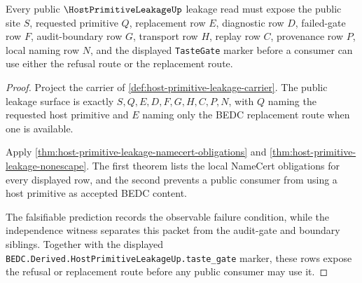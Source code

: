 \begin{theorem}
\label{thm:host-primitive-leakage-public-export}
Every public $\HostPrimitiveLeakageUp$ leakage read must expose the public site $S$, requested primitive $Q$, replacement row $E$, diagnostic row $D$, failed-gate row $F$, audit-boundary row $G$, transport row $H$, replay row $C$, provenance row $P$, local naming row $N$, and the displayed \texttt{TasteGate} marker before a consumer can use either the refusal route or the replacement route.
\end{theorem}
\begin{proof}
Project the carrier of \autoref{def:host-primitive-leakage-carrier}. The public leakage surface is exactly $S,Q,E,D,F,G,H,C,P,N$, with $Q$ naming the requested host primitive and $E$ naming only the BEDC replacement route when one is available.

Apply \autoref{thm:host-primitive-leakage-namecert-obligations} and \autoref{thm:host-primitive-leakage-nonescape}. The first theorem lists the local NameCert obligations for every displayed row, and the second prevents a public consumer from using a host primitive as accepted BEDC content.

The falsifiable prediction records the observable failure condition, while the independence witness separates this packet from the audit-gate and boundary siblings. Together with the displayed \texttt{BEDC.Derived.HostPrimitiveLeakageUp.taste\_gate} marker, these rows expose the refusal or replacement route before any public consumer may use it.
\end{proof}

